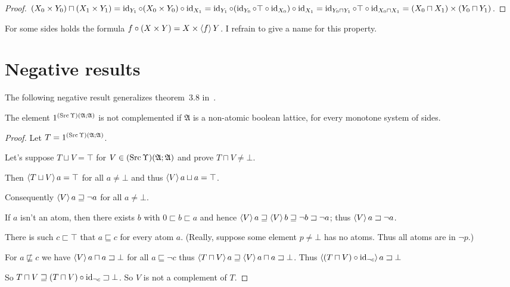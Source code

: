 \begin{proof}
$(X_0 \times Y_0) \sqcap (X_1 \times Y_1) = \operatorname{id}_{Y_1} \circ (X_0 \times
Y_0) \circ \operatorname{id}_{X_1} = \operatorname{id}_{Y_1} \circ (\operatorname{id}_{Y_0} \circ \top
\circ \operatorname{id}_{X_0}) \circ \operatorname{id}_{X_1} = \operatorname{id}_{Y_0 \sqcap Y_1}
\circ \top \circ \operatorname{id}_{X_0 \sqcap X_1} = (X_0 \sqcap X_1) \times (Y_0
\sqcap Y_1)$.
\end{proof}

For some sides holds the formula $f\circ(X\times Y) = X\times\left\langle f\right\rangle Y$.
I refrain to give a name for this property.

\section{Negative results}

The following negative result generalizes theorem~3.8 in~\cite{tprod-dist-lat}.

\begin{thm}\label{neg-prod}
  The element $1^{(\operatorname{Src}\Upsilon)(\mathfrak{A}; \mathfrak{A})}$ is not
  complemented if $\mathfrak{A}$ is a non-atomic boolean lattice,
  for every monotone system of sides.
\end{thm}

\begin{proof}
  Let $T = 1^{(\operatorname{Src}\Upsilon)(\mathfrak{A}; \mathfrak{A})}$.
  
  Let's suppose $T \sqcup V = \top$ for $V \in (\operatorname{Src}\Upsilon) (\mathfrak{A};
  \mathfrak{A})$ and prove $T \sqcap V \neq \bot$.
  
  Then $\left\langle T \sqcup V\right\rangle a = \top$ for all $a \neq \bot$ and thus $\left\langle V\right\rangle
  a \sqcup a = \top$.
  
  Consequently $\left\langle V\right\rangle a \sqsupseteq \neg a$ for all $a \neq \bot$.
  
  If $a$ isn't an atom, then there exists $b$ with $0 \sqsubset b \sqsubset a$
  and hence $\left\langle V\right\rangle a \sqsupseteq \left\langle V\right\rangle b \sqsupseteq \neg b \sqsupset \neg a$;
  thus $\left\langle V\right\rangle a \sqsupset \neg a$.
  
  There is such $c\sqsubset\top$ that $a \sqsubseteq c$ for every atom $a$. (Really,
  suppose some element $p \neq \bot$ has no atoms. Thus all atoms are in $\neg
  p$.)
  
  For $a \nsqsubseteq c$ we have $\left\langle V\right\rangle a \sqcap a \sqsupset \bot$
  for all $a \sqsubseteq \neg c$ thus $\left\langle T \sqcap V\right\rangle a \sqsupseteq
  \left\langle V\right\rangle a \sqcap a \sqsupset \bot$. Thus $\left\langle (T \sqcap V) \circ
  \operatorname{id}_{\neg c}\right\rangle a \sqsupset \bot$
  
  So $T \sqcap V \sqsupseteq (T \sqcap V) \circ \operatorname{id}_{\neg c} \sqsupset
  \bot$. So $V$ is not a complement of $T$.
\end{proof}

